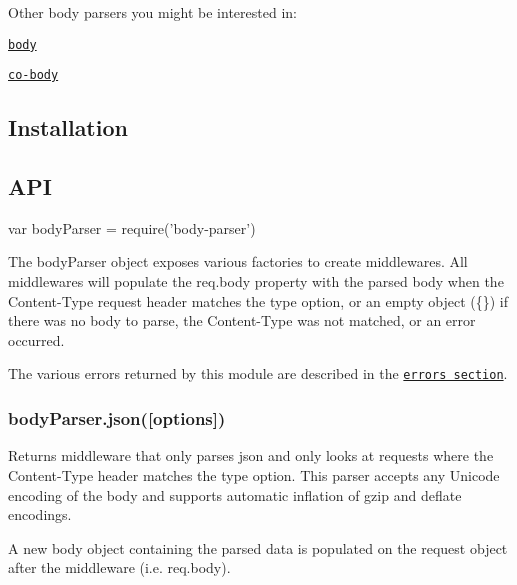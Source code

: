 Other body parsers you might be interested in\+:


\begin{DoxyItemize}
\item \href{https://www.npmjs.org/package/body#readme}{\tt body}
\item \href{https://www.npmjs.org/package/co-body#readme}{\tt co-\/body}
\end{DoxyItemize}

\subsection*{Installation}




\subsection*{A\+PI}


\begin{DoxyCode}
var bodyParser = require('body-parser')
\end{DoxyCode}


The {\ttfamily body\+Parser} object exposes various factories to create middlewares. All middlewares will populate the {\ttfamily req.\+body} property with the parsed body when the {\ttfamily Content-\/\+Type} request header matches the {\ttfamily type} option, or an empty object ({\ttfamily \{\}}) if there was no body to parse, the {\ttfamily Content-\/\+Type} was not matched, or an error occurred.

The various errors returned by this module are described in the \href{#errors}{\tt errors section}.

\subsubsection*{body\+Parser.\+json(\mbox{[}options\mbox{]})}

Returns middleware that only parses {\ttfamily json} and only looks at requests where the {\ttfamily Content-\/\+Type} header matches the {\ttfamily type} option. This parser accepts any Unicode encoding of the body and supports automatic inflation of {\ttfamily gzip} and {\ttfamily deflate} encodings.

A new {\ttfamily body} object containing the parsed data is populated on the {\ttfamily request} object after the middleware (i.\+e. {\ttfamily req.\+body}).

